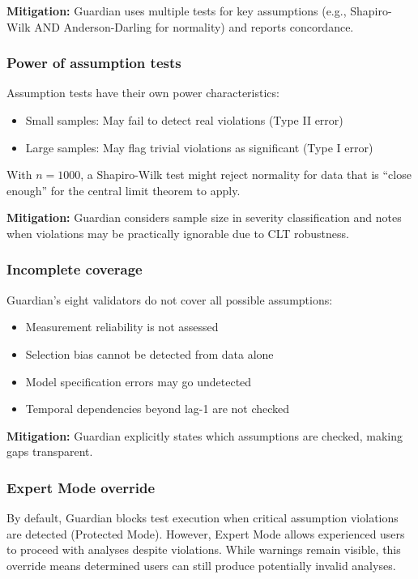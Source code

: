 \documentclass[article]{jss}
\begin{document}
\textbf{Mitigation:} Guardian uses multiple tests for key assumptions (e.g., Shapiro-Wilk AND Anderson-Darling for normality) and reports concordance.

\subsubsection{Power of assumption tests}

Assumption tests have their own power characteristics:
\begin{itemize}
\item Small samples: May fail to detect real violations (Type II error)
\item Large samples: May flag trivial violations as significant (Type I error)
\end{itemize}

With $n = 1000$, a Shapiro-Wilk test might reject normality for data that is ``close enough'' for the central limit theorem to apply.

\textbf{Mitigation:} Guardian considers sample size in severity classification and notes when violations may be practically ignorable due to CLT robustness.

\subsubsection{Incomplete coverage}

Guardian's eight validators do not cover all possible assumptions:
\begin{itemize}
\item Measurement reliability is not assessed
\item Selection bias cannot be detected from data alone
\item Model specification errors may go undetected
\item Temporal dependencies beyond lag-1 are not checked
\end{itemize}

\textbf{Mitigation:} Guardian explicitly states which assumptions are checked, making gaps transparent.

\subsubsection{Expert Mode override}

By default, Guardian blocks test execution when critical assumption violations are detected (Protected Mode). However, Expert Mode allows experienced users to proceed with analyses despite violations. While warnings remain visible, this override means determined users can still produce potentially invalid analyses.
\end{document}
